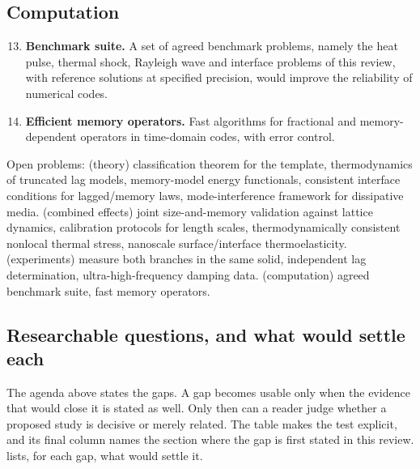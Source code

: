 \subsection{Computation}
\begin{enumerate}
\setcounter{enumi}{12}
\item \textbf{Benchmark suite.} A set of agreed benchmark problems, namely the heat pulse, thermal shock, Rayleigh wave and interface problems of this review, with reference solutions at specified precision, would improve the reliability of numerical codes.
\item \textbf{Efficient memory operators.} Fast algorithms for fractional and memory-dependent operators in time-domain codes, with error control.
\end{enumerate}

\begin{summarybox}[Summary]
Open problems: (theory) classification theorem for the template, thermodynamics of truncated lag models, memory-model energy functionals, consistent interface conditions for lagged/memory laws, mode-interference framework for dissipative media. (combined effects) joint size-and-memory validation against lattice dynamics, calibration protocols for length scales, thermodynamically consistent nonlocal thermal stress, nanoscale surface/interface thermoelasticity. (experiments) measure both branches in the same solid, independent lag determination, ultra-high-frequency damping data. (computation) agreed benchmark suite, fast memory operators.
\end{summarybox}

\subsection{Researchable questions, and what would settle each}\label{sec:research_questions}

The agenda above states the gaps. A gap becomes usable only when the evidence that would close it is stated as well.
Only then can a reader judge whether a proposed study is decisive or merely related. The table makes the test explicit, and its final column names the section where the gap is first
stated in this review.  lists, for each gap, what would settle it.

